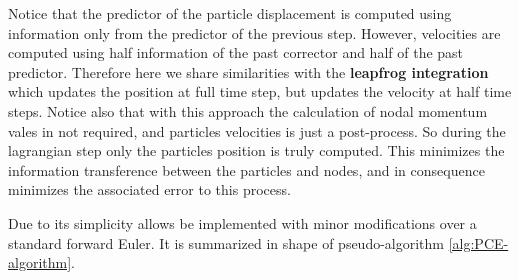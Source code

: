 Notice that the predictor of the particle displacement is
computed using information only from the predictor of the
previous step. However, velocities are computed using half information
of the past corrector and half of the past predictor. Therefore here we share
similarities with the \textbf{leapfrog integration} which updates the
position at full time step, but updates the velocity at half time
steps. Notice also that with this approach the calculation of nodal
momentum vales in not required, and particles velocities is just a
post-process. So during the lagrangian step only the particles
position is truly computed. This minimizes the information
transference between the particles and nodes, and in consequence
minimizes the associated error to this process. 

Due to its simplicity allows be implemented with minor modifications
over a standard forward Euler. It is summarized in shape of
pseudo-algorithm \ref{alg:PCE-algorithm}.

